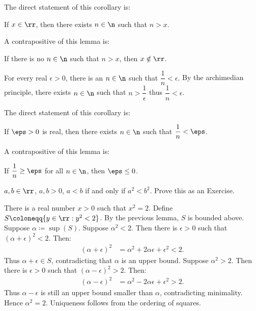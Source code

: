 \begin{remark}
	The direct statement of this corollary is:
	\begin{displayquote}
		If $x\in\rr$, then there exists $n\in\n$ such that $n>x$.
	\end{displayquote}
	A contrapositive of this lemma is:
	\begin{displayquote}
		If there is no $n\in\n$ such that $n>x$, then $x\notin\rr$.
	\end{displayquote}
\end{remark}

\begin{corollary}{
	For every real $\epsilon > 0$, there is an $n\in\n$ such that $\dfrac{1}{n} < \epsilon$.
}
	By the archimedian principle, there exists $n\in\n$ such that $n > \dfrac{1}{\epsilon}$ thus $\dfrac{1}{n} < \epsilon$.
\end{corollary}

\begin{remark}
	The direct statement of this corollary is:
	\begin{displayquote}
		If $\eps > 0$ is real, then there exists $n\in\n$ such that $\dfrac{1}{n} < \eps$.
	\end{displayquote}
	A contrapositive of this lemma is:
	\begin{displayquote}
		If $\dfrac{1}{n} \geq \eps$ for all $n\in\n$, then $\eps \leq 0$.
	\end{displayquote}
\end{remark}

\begin{lemma}{
	$a,b\in\rr$, $a,b > 0$, $a < b$ if and only if $a^2 < b^2$.
}
	Prove this as an Exercise.
\end{lemma}

\begin{corollary}{
	There is a real number $x > 0$ such that $x^2 = 2$.
}
	Define $S \coloneqq \{y\in\rr : y^2 < 2\}$.
	By the previous lemma, $S$ is bounded above.
	Suppose $\alpha\coloneqq\sup(S)$.
	Suppose $\alpha^2 < 2$.
	Then there is $\epsilon > 0$ such that $(\alpha + \epsilon)^2 < 2$.
	Then:
	\begin{align*}
		(\alpha + \epsilon)^2 &= \alpha^2 + 2\alpha\epsilon + \epsilon^2 < 2.
	\end{align*}
	Thus $\alpha + \epsilon \in S$, contradicting that $\alpha$ is an upper bound.
	Suppose $\alpha^2 > 2$.
	Then there is $\epsilon > 0$ such that $(\alpha - \epsilon)^2 > 2$.
	Then:
	\begin{align*}
		(\alpha - \epsilon)^2 &= \alpha^2 - 2\alpha\epsilon + \epsilon^2 > 2.
	\end{align*}
	Thus $\alpha - \epsilon$ is still an upper bound smaller than $\alpha$, contradicting minimality.
	Hence $\alpha^2 = 2$.
	Uniqueness follows from the ordering of squares.
\end{corollary}